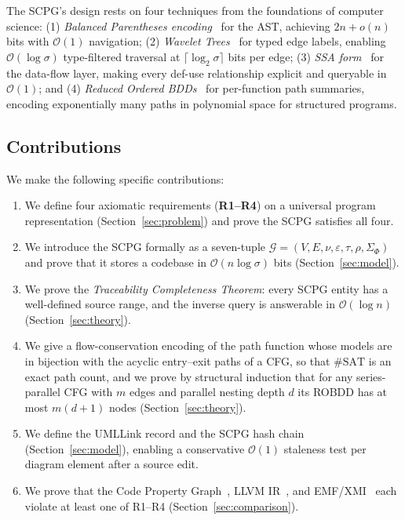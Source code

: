 \documentclass[journal,10pt,twoside]{IEEEtran}
\newcommand{\SCPG}{\mathcal{G}}
\newcommand{\SigPhi}{\Sigma_{\!\Phi}}
\newcommand{\tauF}{\tau}
\newcommand{\SATC}{\#\mathrm{SAT}}
\newcommand{\BigO}{\mathcal{O}}
\begin{document}
The SCPG's design rests on four techniques from the
foundations of computer science: (1) \textit{Balanced
Parentheses encoding}~\cite{munroraman97,sadakanenavarro14}
for the AST, achieving $2n + o(n)$ bits with $\BigO(1)$
navigation; (2) \textit{Wavelet Trees}~\cite{grossi03} for
typed edge labels, enabling $\BigO(\log\sigma)$ type-filtered
traversal at $\lceil\log_2\sigma\rceil$ bits per edge;
(3) \textit{SSA form}~\cite{cytron91} for the data-flow
layer, making every def-use relationship explicit and
queryable in $\BigO(1)$; and (4) \textit{Reduced Ordered
BDDs}~\cite{bryant86} for per-function path summaries,
encoding exponentially many paths in polynomial space for
structured programs.

\subsection{Contributions}

We make the following specific contributions:

\begin{enumerate}
\item We define four axiomatic requirements (\textbf{R1--R4})
  on a universal program representation
  (Section~\ref{sec:problem}) and prove the SCPG satisfies
  all four.

\item We introduce the SCPG formally as a seven-tuple
  $\SCPG = (V, E, \nu, \varepsilon, \tauF, \rho, \SigPhi)$
  and prove that it stores a codebase in
  $\BigO(n\log\sigma)$ bits (Section~\ref{sec:model}).

\item We prove the \textit{Traceability Completeness Theorem}:
  every SCPG entity has a well-defined source range, and the
  inverse query is answerable in $\BigO(\log n)$
  (Section~\ref{sec:theory}).

\item We give a flow-conservation encoding of the path
  function whose models are in bijection with the acyclic
  entry--exit paths of a CFG, so that $\SATC$ is an exact path
  count, and we prove by structural induction that for any
  series-parallel CFG with $m$ edges and parallel nesting
  depth $d$ its ROBDD has at most $m(d+1)$ nodes
  (Section~\ref{sec:theory}).

\item We define the UMLLink record and the SCPG hash chain
  (Section~\ref{sec:model}), enabling a conservative
  $\BigO(1)$ staleness test per diagram element after a
  source edit.

\item We prove that the Code Property
  Graph~\cite{yamaguchi14}, LLVM IR~\cite{lattner04}, and
  EMF/XMI~\cite{emf} each violate at least one of R1--R4
  (Section~\ref{sec:comparison}).
\end{enumerate}
\end{document}
